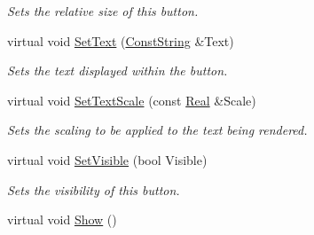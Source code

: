 \begin{DoxyCompactItemize}
\begin{DoxyCompactList}\small\item\em Sets the relative size of this button. \item\end{DoxyCompactList}\item 
virtual void \hyperlink{classphys_1_1UI_1_1TextButton_ae66f149489c4215963dc5b853c838c50}{SetText} (\hyperlink{namespacephys_a5ce5049f8b4bf88d6413c47b504ebb31}{ConstString} \&Text)
\begin{DoxyCompactList}\small\item\em Sets the text displayed within the button. \item\end{DoxyCompactList}\item 
virtual void \hyperlink{classphys_1_1UI_1_1TextButton_aa02f940e49a66417fa58cf335bd48f46}{SetTextScale} (const \hyperlink{namespacephys_af7eb897198d265b8e868f45240230d5f}{Real} \&Scale)
\begin{DoxyCompactList}\small\item\em Sets the scaling to be applied to the text being rendered. \item\end{DoxyCompactList}\item 
virtual void \hyperlink{classphys_1_1UI_1_1TextButton_a07e030ef92f314b1eff663cbc1712d42}{SetVisible} (bool Visible)
\begin{DoxyCompactList}\small\item\em Sets the visibility of this button. \item\end{DoxyCompactList}\item 
\hypertarget{classphys_1_1UI_1_1TextButton_add95c812af6ef7584a2d515a33bac72b}{
virtual void \hyperlink{classphys_1_1UI_1_1TextButton_add95c812af6ef7584a2d515a33bac72b}{Show} ()}
\label{classphys_1_1UI_1_1TextButton_add95c812af6ef7584a2d515a33bac72b}


\end{DoxyCompactItemize}
